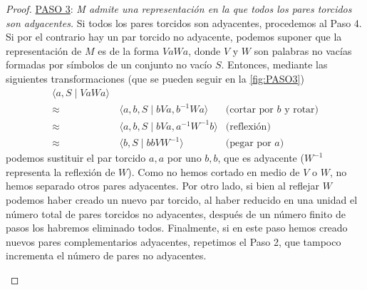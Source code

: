\documentclass[10pt]{report}
\theoremstyle{definition}
\begin{document}
\begin{proof}
\underline{PASO 3}: \textit{M admite una representación en la que todos los pares torcidos son adyacentes.} Si todos los pares torcidos son adyacentes, procedemos al Paso 4. Si por el contrario hay un par torcido no adyacente, podemos suponer que la representación de $M$ es de la forma $VaWa$, donde $V$ y $W$ son palabras no vacías formadas por símbolos de un conjunto no vacío $S$. Entonces, mediante las siguientes transformaciones (que se pueden seguir en la \autoref{fig:PASO3})
\begin{align*}
\langle a,S \mid VaWa \rangle  &&\\
\approx &\, \langle a,b,S \mid bVa, b^{-1}Wa \rangle &\text{(cortar por } b\text{ y rotar)}\\
\approx &\, \langle a,b,S \mid bVa, a^{-1}W^{-1}b \rangle & \text{(reflexión)} \\
\approx &\, \langle b,S \mid bbVW^{-1}\rangle & \text{(pegar por } a\text{)}
\end{align*}
podemos sustituir el par torcido $a,a$ por uno $b,b$, que es adyacente ($W^{-1}$ representa la reflexión de $W$). Como no hemos cortado en medio de $V$ o $W$, no hemos separado otros pares adyacentes. Por otro lado, si bien al reflejar $W$ podemos haber creado un nuevo par torcido, al haber reducido en una unidad el número total de pares torcidos no adyacentes, después de un número finito de pasos los habremos eliminado todos. Finalmente, si en este paso hemos creado nuevos pares complementarios adyacentes, repetimos el Paso 2, que tampoco incrementa el número de pares no adyacentes.\\


\begin{figure}
\centering
{}
\end{figure}
\end{proof}
\end{document}
